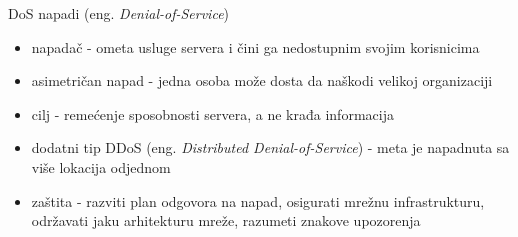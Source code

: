 \begin{frame}{DoS napadi (eng. \textit{Denial-of-Service})}

	\begin{itemize}

		\item napadač - ometa usluge servera i čini ga nedostupnim svojim korisnicima
		\item asimetričan napad - jedna osoba može dosta da naškodi velikoj organizaciji
		\item cilj - remećenje sposobnosti servera, a ne krađa informacija
		\item dodatni tip DDoS (eng. \textit{Distributed Denial-of-Service}) - meta je napadnuta sa više lokacija odjednom
		\item zaštita - razviti plan odgovora na napad, osigurati mrežnu infrastrukturu, održavati jaku arhitekturu mreže, razumeti znakove upozorenja

	\end{itemize}

\end{frame}


